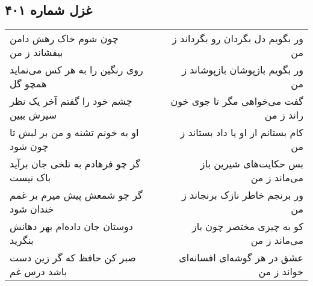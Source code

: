 \begin{center}
\section*{غزل شماره ۴۰۱}
\label{sec:sh401}
\begin{longtable}{l p{0.5cm} r}
چون شوم خاک رهش دامن بیفشاند ز من
&&
ور بگویم دل بگردان رو بگرداند ز من
\\
روی رنگین را به هر کس می‌نماید همچو گل
&&
ور بگویم بازپوشان بازپوشاند ز من
\\
چشم خود را گفتم آخر یک نظر سیرش ببین
&&
گفت می‌خواهی مگر تا جوی خون راند ز من
\\
او به خونم تشنه و من بر لبش تا چون شود
&&
کام بستانم از او یا داد بستاند ز من
\\
گر چو فرهادم به تلخی جان برآید باک نیست
&&
بس حکایت‌های شیرین باز می‌ماند ز من
\\
گر چو شمعش پیش میرم بر غمم خندان شود
&&
ور برنجم خاطر نازک برنجاند ز من
\\
دوستان جان داده‌ام بهر دهانش بنگرید
&&
کو به چیزی مختصر چون باز می‌ماند ز من
\\
صبر کن حافظ که گر زین دست باشد درس غم
&&
عشق در هر گوشه‌ای افسانه‌ای خواند ز من
\\
\end{longtable}
\end{center}
